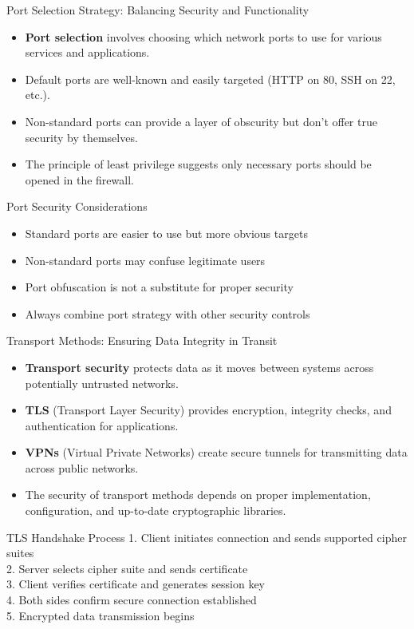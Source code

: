 \documentclass{beamer}
\begin{document}
\begin{frame}{Port Selection Strategy: Balancing Security and Functionality}
\begin{itemize}
\item \textbf{Port selection} involves choosing which network ports to use for various services and applications.
\item Default ports are well-known and easily targeted (HTTP on 80, SSH on 22, etc.).
\item Non-standard ports can provide a layer of obscurity but don't offer true security by themselves.
\item The principle of least privilege suggests only necessary ports should be opened in the firewall.
\end{itemize}

\begin{block}{Port Security Considerations}
\begin{itemize}
\item Standard ports are easier to use but more obvious targets
\item Non-standard ports may confuse legitimate users
\item Port obfuscation is not a substitute for proper security
\item Always combine port strategy with other security controls
\end{itemize}
\end{block}
\end{frame}

\begin{frame}{Transport Methods: Ensuring Data Integrity in Transit}
\begin{itemize}
\item \textbf{Transport security} protects data as it moves between systems across potentially untrusted networks.
\item \textbf{TLS} (Transport Layer Security) provides encryption, integrity checks, and authentication for applications.
\item \textbf{VPNs} (Virtual Private Networks) create secure tunnels for transmitting data across public networks.
\item The security of transport methods depends on proper implementation, configuration, and up-to-date cryptographic libraries.
\end{itemize}

\begin{exampleblock}{TLS Handshake Process}
1. Client initiates connection and sends supported cipher suites\\
2. Server selects cipher suite and sends certificate\\
3. Client verifies certificate and generates session key\\
4. Both sides confirm secure connection established\\
5. Encrypted data transmission begins
\end{exampleblock}
\end{frame}
\end{document}
